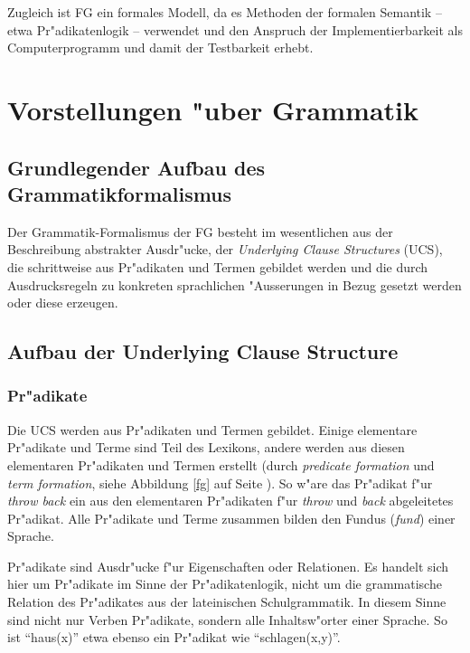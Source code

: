 \documentclass[a4paper]{article}
\begin{document}
Zugleich ist FG ein formales Modell, da es Methoden der
formalen Semantik -- etwa Pr"adikatenlogik -- verwendet und den Anspruch der
Implementierbarkeit als Computerprogramm und damit der Testbarkeit erhebt.

\section{Vorstellungen "uber Grammatik}

\subsection{Grundlegender Aufbau des Grammatikformalismus}

Der Grammatik-Formalismus der FG besteht im wesentlichen aus
der Beschreibung abstrakter Ausdr"ucke, der \emph{Underlying Clause Structures}
(UCS), die schrittweise aus Pr"adikaten und Termen gebildet werden und die
durch Ausdrucksregeln zu konkreten sprachlichen "Ausserungen in Bezug gesetzt
werden oder diese erzeugen.

\subsection{Aufbau der Underlying Clause Structure}

\subsubsection{Pr"adikate}

Die UCS werden aus Pr"adikaten und Termen gebildet. Einige elementare
Pr"adikate und Terme sind Teil des Lexikons, andere werden aus diesen
elementaren Pr"adikaten und Termen erstellt (durch \emph{predicate formation}
und \emph{term formation}, siehe Abbildung \ref{fg} auf Seite \pageref{fg}). So
w"are das Pr"adikat f"ur \emph{throw back} ein aus den elementaren Pr"adikaten
f"ur \emph{throw} und \emph{back} abgeleitetes Pr"adikat. Alle Pr"adikate und
Terme zusammen bilden den Fundus (\emph{fund}) einer Sprache.

Pr"adikate sind Ausdr"ucke f"ur Eigenschaften oder Relationen. Es handelt sich
hier um Pr"adikate im Sinne der Pr"adikatenlogik, nicht um die grammatische
Relation des Pr"adikates aus der lateinischen Schulgrammatik. In diesem Sinne
sind nicht nur Verben Pr"adikate, sondern alle Inhaltsw"orter einer Sprache. So
ist ``haus(x)'' etwa ebenso ein Pr"adikat wie ``schlagen(x,y)''.
\end{document}
